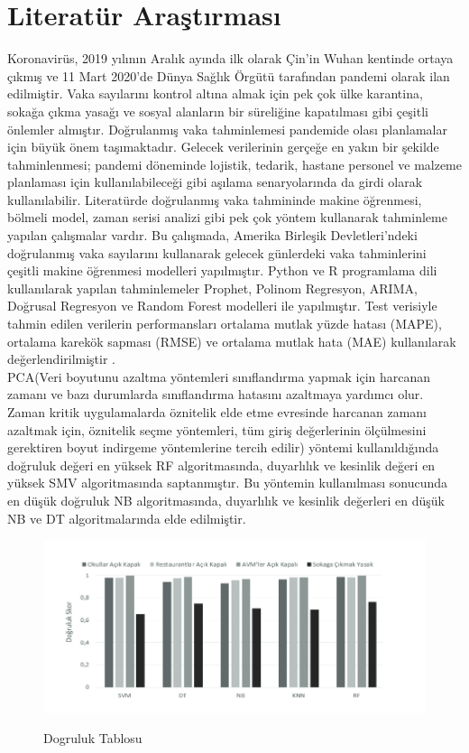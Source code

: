 \documentclass[12pt, a4paper]{article}
\begin{document}
	\section{Literatür Araştırması}
	Koronavirüs, 2019 yılının Aralık ayında ilk olarak Çin’in Wuhan kentinde ortaya çıkmış ve 11 Mart 2020’de Dünya Sağlık Örgütü tarafından pandemi olarak ilan edilmiştir. Vaka sayılarını kontrol altına almak için pek çok ülke karantina, sokağa çıkma yasağı ve sosyal alanların bir süreliğine kapatılması gibi çeşitli önlemler almıştır. Doğrulanmış vaka tahminlemesi pandemide olası planlamalar için büyük önem taşımaktadır. Gelecek verilerinin gerçeğe en yakın bir şekilde tahminlenmesi; pandemi döneminde lojistik, tedarik, hastane personel ve malzeme planlaması için kullanılabileceği gibi aşılama senaryolarında da girdi olarak kullanılabilir. Literatürde doğrulanmış vaka tahmininde makine öğrenmesi, bölmeli model, zaman serisi analizi gibi pek çok yöntem kullanarak tahminleme yapılan çalışmalar vardır. Bu çalışmada, Amerika Birleşik Devletleri’ndeki doğrulanmış vaka sayılarını kullanarak gelecek günlerdeki vaka tahminlerini çeşitli makine öğrenmesi modelleri yapılmıştır. Python ve R programlama dili kullanılarak yapılan tahminlemeler Prophet, Polinom Regresyon, ARIMA, Doğrusal Regresyon ve Random Forest modelleri ile yapılmıştır. Test verisiyle tahmin edilen verilerin performansları ortalama mutlak yüzde hatası (MAPE), ortalama karekök sapması (RMSE) ve ortalama mutlak hata (MAE) kullanılarak değerlendirilmiştir  \cite{article_855113}.\\ 
	PCA(Veri boyutunu azaltma yöntemleri sınıflandırma yapmak için
	harcanan zamanı ve bazı durumlarda sınıflandırma hatasını
	azaltmaya yardımcı olur. Zaman kritik
	uygulamalarda öznitelik elde etme evresinde harcanan zamanı
	azaltmak için, öznitelik seçme yöntemleri, tüm giriş
	değerlerinin ölçülmesini gerektiren boyut indirgeme
	yöntemlerine tercih edilir\cite{genc2007new}) yöntemi kullanıldığında doğruluk değeri en yüksek RF algoritmasında,
	duyarlılık ve kesinlik değeri en yüksek SMV algoritmasında saptanmıştır. Bu
	yöntemin kullanılması sonucunda en düşük doğruluk NB algoritmasında,
	duyarlılık ve kesinlik değerleri en düşük NB ve DT algoritmalarında elde
	edilmiştir\cite{article_1031070}.
	\begin{figure}[!htbp] 
		\caption{Dogruluk Tablosu}
		\centering
		\includegraphics[angle=0, width=\textwidth]{dogruluk.png}
		\label{dogruluk}
	\end{figure}
	\newpage
\end{document}
